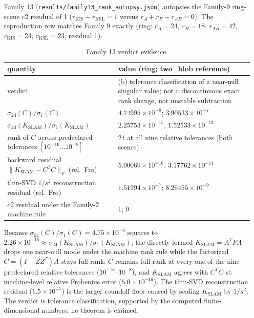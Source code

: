 \documentclass[12pt]{article}
\begin{document}
Family 13 (\texttt{results/family13\_rank\_autopsy.json}) autopsies the
Family-9 ring-scene c2 residual of 1
($r_{\mathrm{KIS}}-r_{\mathrm{KSL}}=1$ versus
$r_A+r_B-r_{AB}=0$). The reproduction row matches Family 9 exactly
(ring: $r_A=24$, $r_B=18$, $r_{AB}=42$, $r_{\mathrm{KIS}}=24$,
$r_{\mathrm{KSL}}=23$, residual 1).

\begin{table}[htbp]
\centering
\small
\caption{Family 13 verdict evidence.}
\label{tab:f13}
\begin{tabular}{p{} p{}}
\toprule
quantity & value (ring; two\_blob reference) \\
\midrule
verdict & (b) tolerance classification of a near-null singular value;
not a discontinuous exact rank change, not unstable subtraction \\
$\sigma_{24}(C)/\sigma_1(C)$ &
$4.74995\times10^{-8}$; $3.90533\times10^{-7}$ \\
$\sigma_{24}(K_{\mathrm{SLAM}})/\sigma_1(K_{\mathrm{SLAM}})$ &
$2.25753\times10^{-15}$; $1.52533\times10^{-13}$ \\
rank of $C$ across predeclared tolerances
$[10^{-16}\ldots10^{-8}]$ & 24 at all nine relative tolerances (both scenes) \\
backward residual $\|K_{\mathrm{SLAM}}-C^TC\|_F$ (rel.\ Fro) &
$5.00069\times10^{-16}$; $3.17762\times10^{-14}$ \\
thin-SVD $1/s^2$ reconstruction residual (rel.\ Fro) &
$1.51994\times10^{-7}$; $8.26455\times10^{-9}$ \\
c2 residual under the Family-2 machine rule &
1; 0 \\
\bottomrule
\end{tabular}
\end{table}

Because $\sigma_{24}(C)/\sigma_1(C)=4.75\times10^{-8}$ squares to
$2.26\times10^{-15}\approx
\sigma_{24}(K_{\mathrm{SLAM}})/\sigma_1(K_{\mathrm{SLAM}})$, the directly
formed $K_{\mathrm{SLAM}}=A^TPA$ drops one near-null mode under the machine
rank rule while the factorized $C=(I-ZZ^T)A$ stays full rank; $C$ remains full
rank at every one of the nine predeclared relative tolerances
($10^{-16}$--$10^{-8}$), and $K_{\mathrm{SLAM}}$ agrees with $C^TC$ at
machine-level relative Frobenius error ($5.0\times10^{-16}$). The thin-SVD
reconstruction residual ($1.5\times10^{-7}$) is the larger roundoff floor
caused by scaling $K_{\mathrm{SLAM}}$ by $1/s^2$. The verdict is tolerance
classification, supported by the computed finite-dimensional numbers; no
theorem is claimed.
\end{document}

